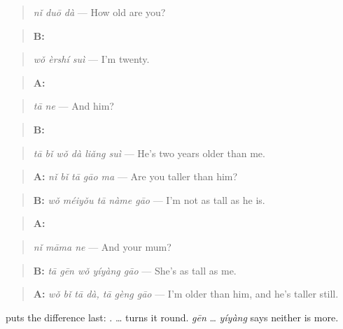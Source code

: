 \begin{quote}
\emph{nǐ duō dà} — How old are you?
\end{quote}

\begin{quote}
\textbf{B:} 
\end{quote}

\begin{quote}
\emph{wǒ èrshí suì} — I'm twenty.
\end{quote}

\begin{quote}
\textbf{A:} 
\end{quote}

\begin{quote}
\emph{tā ne} — And him?
\end{quote}

\begin{quote}
\textbf{B:} 
\end{quote}

\begin{quote}
\emph{tā bǐ wǒ dà liǎng suì} — He's two years older than me.
\end{quote}

\begin{quote}
\textbf{A:} \emph{nǐ bǐ tā gāo ma} — Are you taller than him?
\end{quote}

\begin{quote}
\textbf{B:} \emph{wǒ méiyǒu tā nàme gāo} — I'm not as tall as he is.
\end{quote}

\begin{quote}
\textbf{A:} 
\end{quote}

\begin{quote}
\emph{nǐ māma ne} — And your mum?
\end{quote}

\begin{quote}
\textbf{B:} \emph{tā gēn wǒ yíyàng gāo} — She's as tall as me.
\end{quote}

\begin{quote}
\textbf{A:} \emph{wǒ bǐ tā dà, tā gèng gāo} — I'm older than him, and he's taller still.
\end{quote}

 puts the difference last: .  …  turns it round. \emph{gēn} … \emph{yíyàng} says neither is more.

